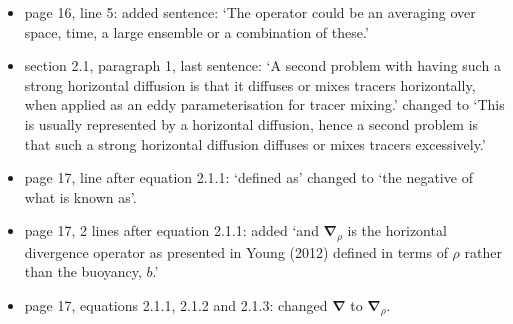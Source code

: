 \documentclass[10pt,a4paper]{article}
\begin{document}
	\begin{itemize}
		\item page 16, line 5: added sentence: `The operator could be an averaging over space, time, a large ensemble or a combination of these.'
		\item section 2.1, paragraph 1, last sentence: `A second problem with having such a strong horizontal diffusion is
		that it diffuses or mixes tracers horizontally, when applied as
		an eddy parameterisation for tracer mixing.' changed to `This is usually represented by a horizontal diffusion, hence
		a second problem is
		that such a strong horizontal diffusion diffuses or mixes tracers excessively.'
		\item page 17, line after equation 2.1.1: `defined as' changed to `the negative of what is known as'.
		\item page 17, 2 lines after equation 2.1.1: added `and $\boldsymbol{\nabla}_{\rho}$ is the horizontal divergence operator as
		presented in Young (2012) defined in terms of $\rho$ rather than the buoyancy, $b$.'
		\item page 17, equations 2.1.1, 2.1.2 and 2.1.3: changed $\boldsymbol{\nabla}$ to $\boldsymbol{\nabla}_{\rho}$.
	\end{itemize}
	
	
	
	
\end{document}
